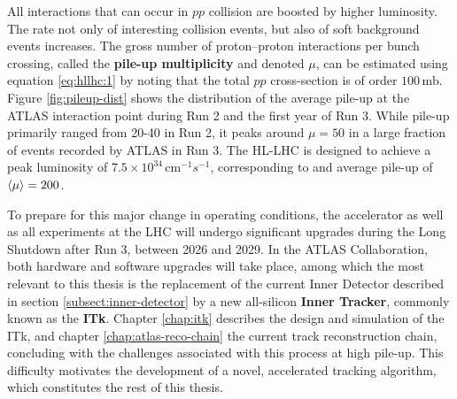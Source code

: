 All interactions that can occur in $pp$ collision are boosted by higher luminosity. 
The rate not only of interesting collision events, but also of soft background events increases.
The gross number of proton--proton interactions per bunch crossing, called the \textbf{pile-up multiplicity} and denoted $\mu$, can be estimated using equation \eqref{eq:hllhc:1} by noting that the total $pp$ cross-section is of order $100\,\mathrm{mb}$.
Figure \ref{fig:pileup-dist} shows the distribution of the average pile-up at the ATLAS interaction point during Run 2 and the first year of Run 3.
While pile-up primarily ranged from 20-40 in Run 2, it peaks around $\mu=50$ in a large fraction of events recorded by ATLAS in Run 3.
The HL-LHC is designed to achieve a peak luminosity of $7.5\times 10^{34} \, \mathrm{cm}^{-1}s^{-1} $, corresponding to and average pile-up of $\expval{\mu}=200$.

To prepare for this major change in operating conditions, the accelerator as well as all experiments at the LHC will undergo significant upgrades during the Long Shutdown after Run 3, between 2026 and 2029. 
In the ATLAS Collaboration, both hardware and software upgrades will take place, among which the most relevant to this thesis is the replacement of the current Inner Detector described in section \ref{subsect:inner-detector} by a new all-silicon \textbf{Inner Tracker}, commonly known as the \textbf{ITk}. 
Chapter \ref{chap:itk} describes the design and simulation of the ITk, and chapter \ref{chap:atlas-reco-chain} the current track reconstruction chain, concluding with the challenges associated with this process at high pile-up. 
This difficulty motivates the development of a novel, accelerated tracking algorithm, which constitutes the rest of this thesis.





